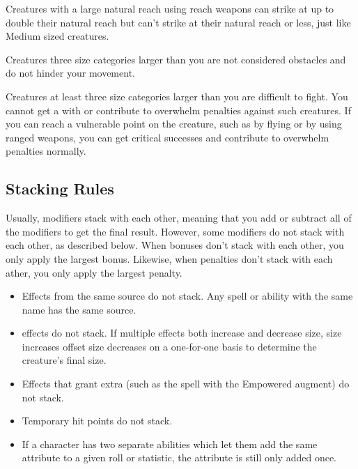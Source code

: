             Creatures with a large natural reach using reach weapons can strike at up to double their natural reach but can't strike at their natural reach or less, just like Medium sized creatures.

             Creatures three size categories larger than you are not considered obstacles and do not hinder your movement.

             Creatures at least three size categories larger than you are difficult to fight. You cannot get a  with  or contribute to overwhelm penalties against such creatures. If you can reach a vulnerable point on the creature, such as by flying or by using ranged weapons, you can get critical successes and contribute to overwhelm penalties normally.

    \subsection{Stacking Rules}\label{Stacking Rules}
        Usually, modifiers stack with each other, meaning that you add or subtract all of the modifiers to get the final result. However, some modifiers do not stack with each other, as described below. When bonuses don't stack with each other, you only apply the largest bonus. Likewise, when penalties don't stack with each ather, you only apply the largest penalty.


        \begin{itemize}
            \item Effects from the same source do not stack. Any spell or ability with the same name has the same source.
            \item {} effects do not stack.
                If multiple effects both increase and decrease size, size increases offset size decreases on a one-for-one basis to determine the creature's final size.
            \item Effects that grant extra  (such as the  spell with the Empowered augment) do not stack.
            \item Temporary hit points do not stack.
            \item If a character has two separate abilities which let them add the same attribute to a given roll or statistic, the attribute is still only added once.
        \end{itemize}

